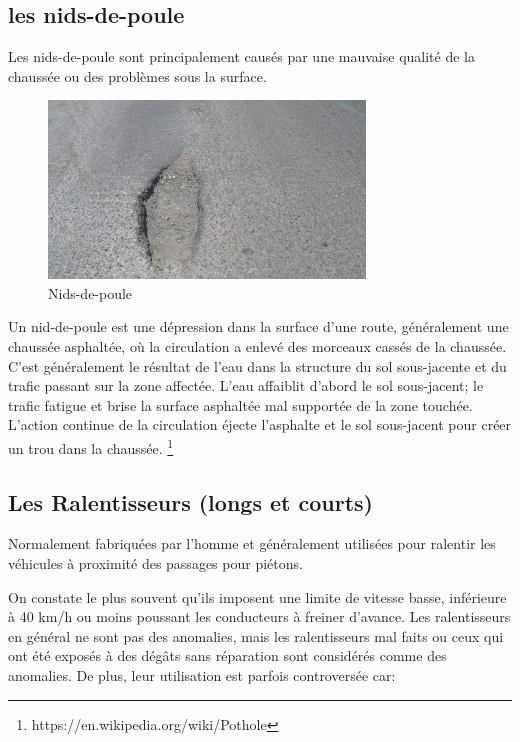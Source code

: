 \subsection{les nids-de-poule}

Les nids-de-poule sont principalement causés par une mauvaise qualité de la chaussée ou des problèmes sous la surface.

\begin{figure}[h!]
  \center
  \includegraphics[width=0.75\textwidth]{Images/chapter1/Pothole.jpg}
  \caption{Nids-de-poule}
\end{figure}

Un nid-de-poule est une dépression dans la surface d'une route, généralement une chaussée asphaltée, où la circulation
a enlevé des morceaux cassés de la chaussée.
C'est généralement le résultat de l'eau dans la structure du sol sous-jacente et du trafic passant sur la zone affectée.
L'eau affaiblit d'abord le sol sous-jacent; le trafic fatigue et brise la surface asphaltée mal supportée de la zone touchée.
L'action continue de la circulation éjecte l'asphalte et le sol sous-jacent pour créer un trou dans la chaussée.
\footnote{https://en.wikipedia.org/wiki/Pothole}



\subsection{Les Ralentisseurs (longs et courts)}

Normalement fabriquées par l'homme et généralement utilisées pour ralentir les véhicules à proximité des passages pour piétons.

On constate le plus souvent qu'ils imposent une limite de vitesse basse, inférieure à 40 km/h ou moins poussant les conducteurs à freiner d'avance.
Les ralentisseurs en général ne sont pas des anomalies, mais les ralentisseurs mal faits ou ceux qui ont été exposés à des dégâts sans réparation sont considérés comme des anomalies.
De plus, leur utilisation est parfois controversée car:

